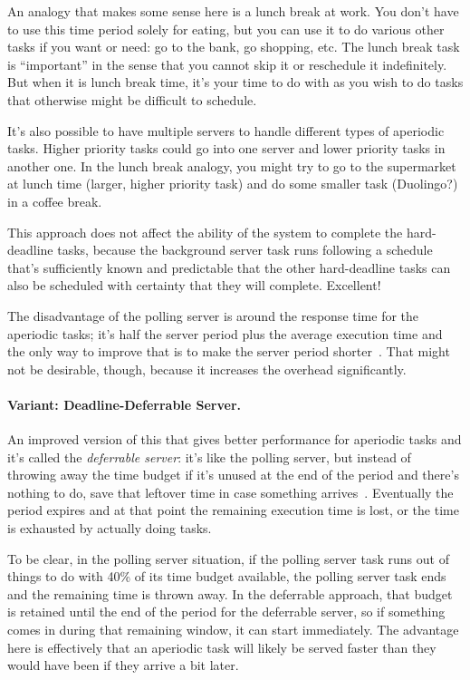 An analogy that makes some sense here is a lunch break at work. You don't have to use this time period solely for eating, but you can use it to do various other tasks if you want or need: go to the bank, go shopping, etc. The lunch break task is ``important'' in the sense that you cannot skip it or reschedule it indefinitely. But when it is lunch break time, it's your time to do with as you wish to do tasks that otherwise might be difficult to schedule.

It's also possible to have multiple servers to handle different types of aperiodic tasks. Higher priority tasks could go into one server and lower priority tasks in another one. In the lunch break analogy, you might try to go to the supermarket at lunch time (larger, higher priority task) and do some smaller task (Duolingo?) in a coffee break.

This approach does not affect the ability of the system to complete the hard-deadline tasks, because the background server task runs following a schedule that's sufficiently known and predictable that the other hard-deadline tasks can also be scheduled with certainty that they will complete. Excellent!

The disadvantage of the polling server is around the response time for the aperiodic tasks; it's half the server period plus the average execution time and the only way to improve that is to make the server period shorter~\cite{aperiodic-server}. That might not be desirable, though, because it increases the overhead significantly. 

\paragraph{Variant: Deadline-Deferrable Server.}
An improved version of this that gives better performance for aperiodic tasks and it's called the \textit{deferrable server}: it's like the polling server, but instead of throwing away the time budget if it's unused at the end of the period and there's nothing to do, save that leftover time in case something arrives~\cite{aperiodic-server}. Eventually the period expires and at that point the remaining execution time is lost, or the time is exhausted by actually doing tasks.

To be clear, in the polling server situation, if the polling server task runs out of things to do with 40\% of its time budget available, the polling server task ends and the remaining time is thrown away. In the deferrable approach, that budget is retained until the end of the period for the deferrable server, so if something comes in during that remaining window, it can start immediately. The advantage here is effectively that an aperiodic task will likely be served faster than they would have been if they arrive a bit later.

